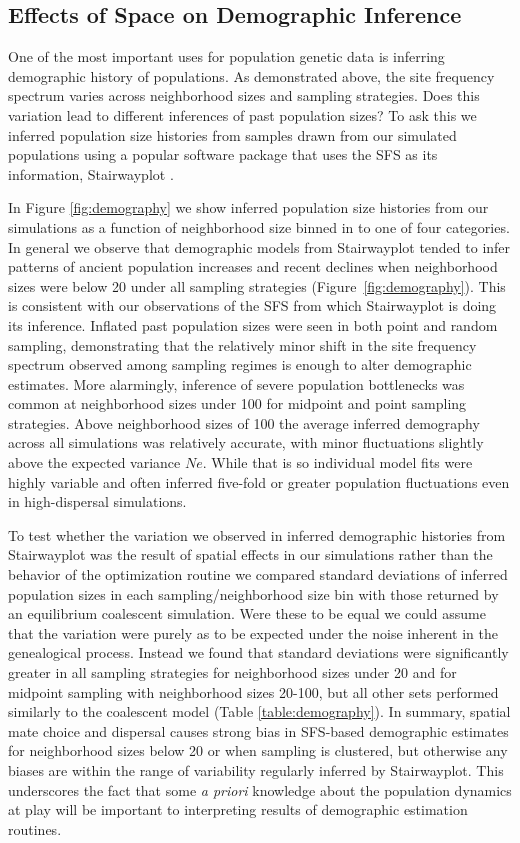 \documentclass[10pt,twoside,lineno]{gsajnl}
\begin{document}
\subsection{Effects of Space on Demographic Inference}
One of the most important uses for population genetic data is inferring demographic history of populations. As demonstrated above, the site frequency spectrum varies across neighborhood sizes and sampling strategies. Does this variation lead to different inferences of past population sizes? To ask this we inferred population size histories from samples drawn from our simulated populations using a popular software package that uses the SFS as its information, Stairwayplot \citep{Liu2015}.

In Figure \ref{fig:demography} we show inferred population size histories from our simulations as a function of neighborhood size binned in to one of four categories. In general we observe that demographic models from Stairwayplot tended to infer patterns of ancient population increases and recent declines when neighborhood sizes were below 20 under all sampling strategies (Figure~\ref{fig:demography}). This is consistent with our observations of the SFS from which Stairwayplot is doing its inference. Inflated past population sizes were seen in both point and random sampling, demonstrating that the relatively minor shift in the site frequency spectrum observed among sampling regimes is enough to alter demographic estimates. More alarmingly, inference of severe population bottlenecks was  common at neighborhood sizes under 100 for midpoint and point sampling strategies. Above neighborhood sizes of 100 the average inferred demography across all simulations was relatively accurate, with minor fluctuations slightly above the expected variance $Ne$. While that is so individual model fits were highly variable and often inferred five-fold or greater population fluctuations even in high-dispersal simulations.  

To test whether the variation we observed in inferred demographic histories from Stairwayplot was the result of spatial effects in our simulations rather than the behavior of the optimization routine we compared standard deviations of inferred population sizes in each sampling/neighborhood size bin with those returned by an equilibrium coalescent simulation. Were these to be equal we could assume that the variation were purely as to be expected under the noise inherent in the genealogical process. Instead we found that standard deviations were significantly greater in all sampling strategies for neighborhood sizes under 20 and for midpoint sampling with neighborhood sizes 20-100, but all other sets performed similarly to the coalescent model (Table \ref{table:demography}). In summary, spatial mate choice and dispersal causes strong bias in SFS-based demographic estimates for neighborhood sizes below 20 or when sampling is clustered, but otherwise any biases are within the range of variability regularly inferred by Stairwayplot. This underscores the fact that some \textit{a priori} knowledge about the population dynamics at play will be important to interpreting results of demographic estimation routines. 
\end{document}
